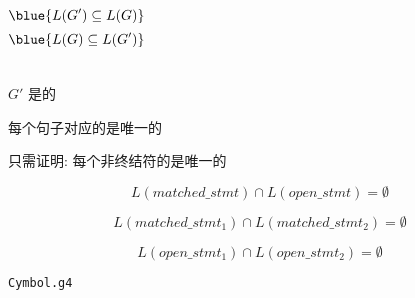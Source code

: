 \begin{frame}{}
  \begin{center}


    \pause
    \begin{columns}
        \[
          \blue{L(G') \subseteq L(G)}
        \]
        \[
          \blue{L(G) \subseteq L(G')}
        \]
        \pause
        \vspace{-0.60cm}
        \begin{center}
        \end{center}
    \end{columns}
  \end{center}
\end{frame}

\begin{frame}{}
  \begin{center}
    $G'$ 是的

    \pause
    \vspace{0.20cm}
    每个句子对应的是唯一的

    \pause
    \vspace{0.30cm}
    只需证明: 每个非终结符的是唯一的

    \pause
    \[
      L(matched\_stmt) \cap L(open\_stmt) = \emptyset
    \]

    \pause
    \vspace{-0.50cm}
    \[
      L(matched\_stmt_{1}) \cap L(matched\_stmt_{2}) = \emptyset
    \]

    \pause
    \vspace{-0.50cm}
    \[
      L(open\_stmt_{1}) \cap L(open\_stmt_{2}) = \emptyset
    \]
  \end{center}
\end{frame}

\begin{frame}{}

  \begin{center}
    \texttt{Cymbol.g4}
  \end{center}
\end{frame}

